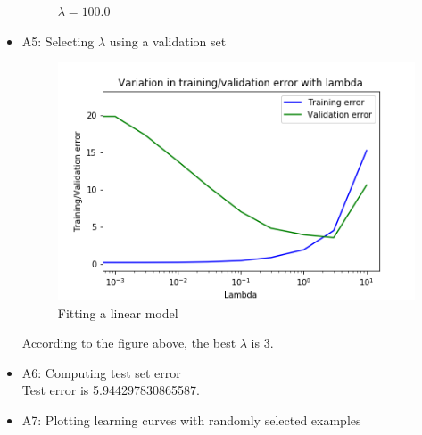 \documentclass{article}
\begin{document}
\begin{itemize}
\begin{figure}[htbp]
{\begin{minipage}[t]{0.5\textwidth}
    \end{minipage}
    }
    \caption{$\lambda = 100.0$}
\end{figure}
\pagebreak
\item A5: Selecting $\lambda$ using a validation set
\begin{figure}[htbp]
	\centering
	\includegraphics[scale = 0.7]{validation_error_with_lambda.png}
	\caption{Fitting a linear model}
\end{figure}
According to the figure above, the best $\lambda$ is 3.\\
\item A6: Computing test set error\\
Test error is 5.944297830865587.\\
\item A7: Plotting learning curves with randomly selected examples\\

\end{itemize}
\end{document}
